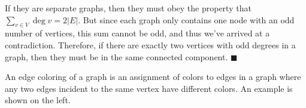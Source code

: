 \documentclass[11pt]{article}
\begin{document}
\begin{Parts}
\begin{solution}
        If they are separate graphs, then they must obey the property that $\sum_{v \in V} \deg v = 2|E|$. But since each graph only contains one node with an odd number of vertices, this sum cannot be odd, and thus we've arrived at a contradiction. Therefore, if there are exactly two vertices with odd degrees in a graph, then they must be in the same connected component. $\blacksquare$
    \end{solution}
\end{Parts}
\pagebreak 
{}

An edge coloring of a graph is an assignment of colors to edges in a graph where any two edges incident to the same vertex have different colors. An example is shown on the left.

\begin{center}
\end{center}
\end{document}
